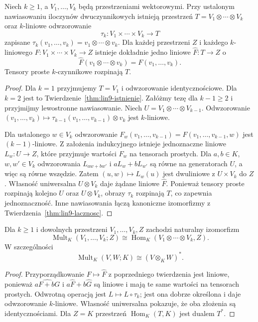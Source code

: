 \begin{twierdzenie}
\label{thm:lin9-wielokrotny}
Niech \(k\geq1\), a
\(V_1,\ldots,V_k\) będą
przestrzeniami wektorowymi.
Przy ustalonym nawiasowaniu
iloczynów dwuczynnikowych
istnieją przestrzeń
\(T=V_1\otimes\cdots\otimes V_k\)
oraz \(k\)-liniowe odwzorowanie
\[
 \tau_k\colon V_1\times\cdots\times V_k
       \longrightarrow T
\]
zapisane
\(\tau_k(v_1,\ldots,v_k)
=v_1\otimes\cdots\otimes v_k\).
Dla każdej przestrzeni \(Z\)
i każdego \(k\)-liniowego
\(F\colon V_1\times\cdots\times V_k\to Z\)
istnieje dokładnie jedno
liniowe \(\widehat F\colon T\to Z\)
o
\[
 \widehat F(v_1\otimes\cdots\otimes v_k)
 =F(v_1,\ldots,v_k).
\]
Tensory proste \(k\)-czynnikowe
rozpinają \(T\).
\end{twierdzenie}
\begin{proof}
Dla \(k=1\) przyjmujemy
\(T=V_1\) i odwzorowanie
identycznościowe.
Dla \(k=2\) jest to
Twierdzenie~\ref{thm:lin9-istnienie}.
Załóżmy tezę dla \(k-1\geq2\)
i przyjmijmy lewostronne nawiasowanie.
Niech \(U=V_1\otimes\cdots\otimes V_{k-1}\).
Odwzorowanie
\((v_1,\ldots,v_k)\mapsto
\tau_{k-1}(v_1,\ldots,v_{k-1})
\otimes v_k\)
jest \(k\)-liniowe.

Dla ustalonego \(w\in V_k\)
odwzorowanie
\(F_w(v_1,\ldots,v_{k-1})
=F(v_1,\ldots,v_{k-1},w)\)
jest \((k-1)\)-liniowe.
Z założenia indukcyjnego
istnieje jednoznaczne liniowe
\(L_w\colon U\to Z\),
które przyjmuje wartości \(F_w\)
na tensorach prostych.
Dla \(a,b\in K\), \(w,w'\in V_k\)
odwzorowania
\(L_{aw+bw'}\) i
\(aL_w+bL_{w'}\)
są równe na generatorach \(U\),
a więc są równe wszędzie.
Zatem \((u,w)\mapsto L_w(u)\)
jest dwuliniowe z \(U\times V_k\) do \(Z\).
Własność uniwersalna \(U\otimes V_k\)
daje żądane liniowe \(\widehat F\).
Ponieważ tensory proste
rozpinają kolejno \(U\)
oraz \(U\otimes V_k\),
obrazy \(\tau_k\) rozpinają \(T\),
co zapewnia jednoznaczność.
Inne nawiasowania łączą
kanoniczne izomorfizmy
z
Twierdzenia~\ref{thm:lin9-lacznosc}.
\end{proof}

\begin{wniosek}
\label{cor:lin9-linearyzacja}
Dla \(k\geq1\) i dowolnych
przestrzeni \(V_1,\ldots,V_k,Z\)
zachodzi naturalny izomorfizm
\[
 \operatorname{Mult}_K(V_1,\ldots,V_k;Z)
 \cong
 \operatorname{Hom}_K(
 V_1\otimes\cdots\otimes V_k,Z).
\]
W szczególności
\[
 \operatorname{Mult}_K(V,W;K)
 \cong(V\otimes_KW)^*.
\]
\end{wniosek}
\begin{proof}
Przyporządkowanie
\(F\mapsto\widehat F\)
z poprzedniego twierdzenia
jest liniowe, ponieważ
\(\widehat{aF+bG}\) i
\(a\widehat F+b\widehat G\)
są liniowe i mają te same
wartości na tensorach prostych.
Odwrotną operacją jest
\(L\mapsto L\circ\tau_k\);
jest ona dobrze określona
i daje odwzorowanie \(k\)-liniowe.
Własność uniwersalna pokazuje,
że oba złożenia są identycznościami.
Dla \(Z=K\) przestrzeń
\(\operatorname{Hom}_K(T,K)\)
jest dualem \(T^*\).
\end{proof}

